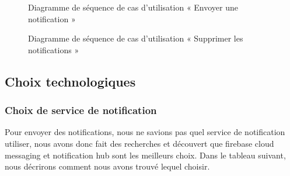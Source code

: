\begin{figure}[H]
  \centering
  \caption{Diagramme de séquence de cas d'utilisation « Envoyer une notification »}
  \label{fig:sequence_send_notification}
\end{figure}

\begin{figure}[H]
  \centering
  \caption{Diagramme de séquence de cas d'utilisation « Supprimer les notifications »}
  \label{fig:sequence_delete_notification}
\end{figure}

\subsection{Choix technologiques}
\subsubsection{Choix de service de notification}
Pour envoyer des notifications, nous ne savions pas quel service de notification utiliser, nous avons donc fait des recherches et découvert que firebase cloud messaging et notification hub sont les meilleurs choix. Dans le tableau suivant, nous décrirons comment nous avons trouvé lequel choisir.

